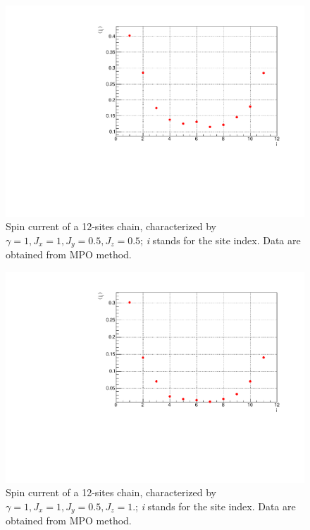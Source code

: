\begin{figure}[H]
    \centering
    \includegraphics[scale=0.7]{Figures/12sites/SpinCurrL012m060Time002000_J10505.pdf}
    \caption{Spin current of a 12-sites chain, characterized by $\gamma=1, J_x=1, J_y=0.5, J_z=0.5$; \emph{i} stands for the site index. Data are obtained from MPO method.}
    \label{fig:my_label}
\end{figure}

\begin{figure}[H]
    \centering
    \includegraphics[scale=0.7]{Figures/12sites/SpinCurrL012m060Time002000_J1051.pdf}
    \caption{Spin current of a 12-sites chain, characterized by $\gamma=1, J_x=1, J_y=0.5, J_z=1.$; \emph{i} stands for the site index. Data are obtained from MPO method.}
    \label{fig:my_label}
\end{figure}

